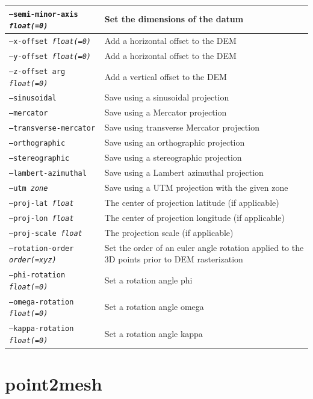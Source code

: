 \begin{longtable}{|l|p{10cm}|}
\texttt{--semi-minor-axis \textit{float(=0)}} & Set the dimensions of the datum \\ \hline
\texttt{--x-offset \textit{float(=0)}} & Add a horizontal offset to the \ac{DEM} \\ \hline
\texttt{--y-offset \textit{float(=0)}} & Add a horizontal offset to the \ac{DEM} \\ \hline
\texttt{--z-offset arg \textit{float(=0)}} & Add a vertical offset to the \ac{DEM} \\ \hline
\texttt{--sinusoidal} & Save using a sinusoidal projection \\ \hline
\texttt{--mercator} & Save using a Mercator projection \\ \hline
\texttt{--transverse-mercator} & Save using transverse Mercator projection \\ \hline
\texttt{--orthographic} & Save using an orthographic projection \\ \hline
\texttt{--stereographic} & Save using a stereographic projection \\ \hline
\texttt{--lambert-azimuthal} & Save using a Lambert azimuthal projection \\ \hline
\texttt{--utm \textit{zone}} & Save using a UTM projection with the given zone \\ \hline
\texttt{--proj-lat \textit{float}} & The center of projection latitude (if applicable) \\ \hline
\texttt{--proj-lon \textit{float}} & The center of projection longitude (if applicable) \\ \hline
\texttt{--proj-scale \textit{float}} & The projection scale (if applicable) \\ \hline
\texttt{--rotation-order \textit{order(=xyz)}} & Set the order of an euler angle rotation applied to the 3D points prior to \ac{DEM} rasterization \\ \hline
\texttt{--phi-rotation \textit{float(=0)}} & Set a rotation angle phi \\ \hline
\texttt{--omega-rotation \textit{float(=0)}} & Set a rotation angle omega \\ \hline
\texttt{--kappa-rotation \textit{float(=0)}} & Set a rotation angle kappa \\ \hline
\end{longtable}

\section{point2mesh}
\label{point2mesh}

